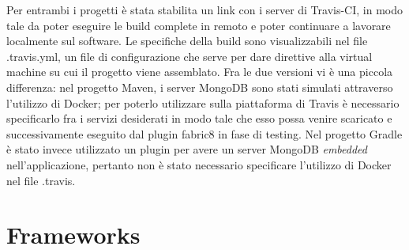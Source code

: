 Per entrambi i progetti è stata stabilita un link con i server di Travis-CI, in modo tale da poter eseguire le build complete in remoto e poter continuare a lavorare localmente sul software.\newline
Le specifiche della build sono visualizzabili nel file .travis.yml, un file di configurazione che serve per dare direttive alla virtual machine su cui il progetto viene assemblato.\newline
Fra le due versioni vi è una piccola differenza: nel progetto Maven, i server MongoDB sono stati simulati attraverso l'utilizzo di Docker; per poterlo utilizzare sulla piattaforma di Travis è necessario specificarlo fra i servizi desiderati in modo tale che esso possa venire scaricato e successivamente eseguito dal plugin fabric8 in fase di testing.\newline
Nel progetto Gradle è stato invece utilizzato un plugin per avere un server MongoDB \textsl{embedded} nell'applicazione, pertanto non è stato necessario specificare l'utilizzo di Docker nel file .travis.

\section{Frameworks}

